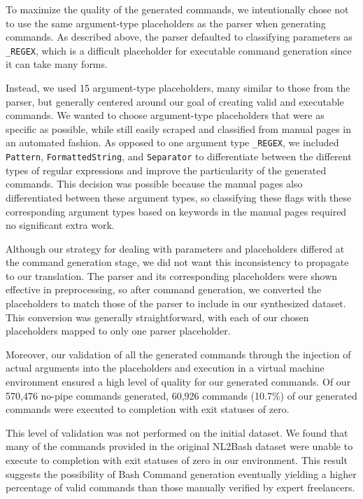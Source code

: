 \documentclass{river-journal}
\begin{document}
To maximize the quality of the generated commands, we intentionally chose not to use the same argument-type placeholders as the parser when generating commands. As described above, the parser defaulted to classifying parameters as \texttt{\_REGEX}, which is a difficult placeholder for executable command generation since it can take many forms.

Instead, we used 15 argument-type placeholders, many similar to those from the parser, but generally centered around our goal of creating valid and executable commands. We wanted to choose argument-type placeholders that were as specific as possible, while still easily scraped and classified from manual pages in an automated fashion. As opposed to one argument type \texttt{\_REGEX}, we included \texttt{Pattern}, \texttt{FormattedString}, and \texttt{Separator} to differentiate between the different types of regular expressions and improve the particularity of the generated commands. This decision was possible because the manual pages also differentiated between these argument types, so classifying these flags with these corresponding argument types based on keywords in the manual pages required no significant extra work.

Although our strategy for dealing with parameters and placeholders differed at the command generation stage, we did not want this inconsistency to propagate to our translation. The parser and its corresponding placeholders were shown effective in preprocessing, so after command generation, we converted the placeholders to match those of the parser to include in our synthesized dataset. This conversion was generally straightforward, with each of our chosen placeholders mapped to only one parser placeholder.

Moreover, our validation of all the generated commands through the injection of actual arguments into the placeholders and execution in a virtual machine environment ensured a high level of quality for our generated commands. Of our 570,476 no-pipe commands generated, 60,926 commands  (10.7\%) of our generated commands were executed to completion with exit statuses of zero.

This level of validation was not performed on the initial dataset.  We found that many of the commands provided in the original NL2Bash dataset were unable to execute to completion with exit statuses of zero in our environment. This result suggests the possibility of Bash Command generation eventually yielding a higher percentage of valid commands than those manually verified by expert freelancers.
\end{document}

